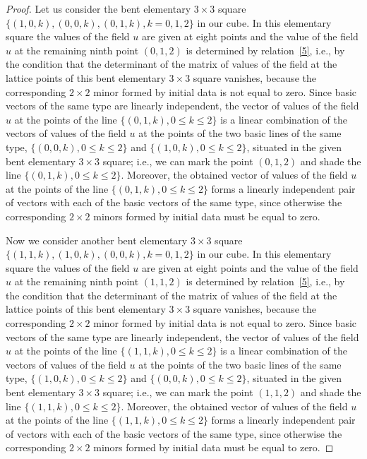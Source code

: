 \documentclass[11pt]{article}
\begin{document}
\begin{proof}
Let us consider the bent elementary $3 \times 3$ square $\{(1, 0,
k), (0, 0, k), (0, 1, k), k = 0, 1, 2\}$ in our cube. In this
elementary square the values of the f\/ield $u$ are given at eight
points and the value of the f\/ield $u$ at the remaining ninth point
$(0, 1, 2)$ is determined by relation~\eqref{5}, i.e., by the
condition that the determinant of the matrix of values of the f\/ield
at the lattice points of this bent elementary $3 \times 3$ square
vanishes, because the corresponding $2 \times 2$ minor formed by
initial data is not equal to zero. Since basic vectors of the same
type are linearly independent, the vector of values of the f\/ield $u$
at the points of the line $\{(0, 1, k), 0 \leq k \leq 2\}$ is a
linear combination of the vectors of values of the f\/ield $u$ at the
points of the two basic lines of the same type, $\{(0, 0, k), 0 \leq
k \leq 2\}$ and $\{(1, 0, k), 0 \leq k \leq 2\}$, situated in the
given bent elementary $3 \times 3$ square; i.e., we can mark the
point $(0, 1, 2)$ and shade the line $\{(0, 1, k), 0 \leq k \leq
2\}$. Moreover, the obtained vector of values of the f\/ield $u$ at
the points of the line $\{(0, 1, k), 0 \leq k \leq 2\}$ forms a
linearly independent pair of vectors with each of the basic vectors
of the same type, since otherwise the corresponding $2 \times 2$
minors formed by initial data must be equal to zero.




Now we consider another bent elementary $3 \times 3$ square $\{(1,
1, k), (1, 0, k), (0, 0, k), k = 0, 1, 2\}$ in our cube. In this
elementary square the values of the f\/ield $u$ are given at eight
points and the value of the f\/ield $u$ at the remaining ninth point
$(1, 1, 2)$ is determined by relation~\eqref{5}, i.e., by the
condition that the determinant of the matrix of values of the f\/ield
at the lattice points of this bent elementary $3 \times 3$ square
vanishes, because the corresponding $2 \times 2$ minor formed by
initial data is not equal to zero. Since basic vectors of the same
type are linearly independent, the vector of values of the f\/ield $u$
at the points of the line $\{(1, 1, k), 0 \leq k \leq 2\}$ is a
linear combination of the vectors of values of the f\/ield $u$ at the
points of the two basic lines of the same type, $\{(1, 0, k), 0 \leq
k \leq 2\}$ and $\{(0, 0, k), 0 \leq k \leq 2\}$, situated in the
given bent elementary $3 \times 3$ square; i.e., we can mark the
point $(1, 1, 2)$ and shade the line $\{(1, 1, k), 0 \leq k \leq
2\}$. Moreover, the obtained vector of values of the f\/ield $u$ at
the points of the line $\{(1, 1, k), 0 \leq k \leq 2\}$ forms a
linearly independent pair of vectors with each of the basic vectors
of the same type, since otherwise the corresponding $2 \times 2$
minors formed by initial data must be equal to zero.





\end{proof}
\end{document}

